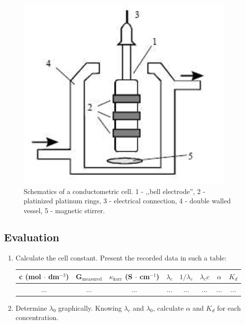 \begin{figure}
\centering
\includegraphics{fig/cond.eps}
\caption{Schematics of a conductometric cell. 1 - ,,bell electrode'', 2 - platinized platinum rings, 3 - electrical connection, 4 - double walled vessel, 5 - magnetic stirrer.}
\label{fig:vez}
\end{figure}

\subsection{Evaluation}

\begin{enumerate}
\item Calculate the cell constant.
Present the recorded data in such a table:

\begin{table}[!h]
\centering
\begin{tabular}{|c|c|c|c|c|c|c|c|}
\hline
c (mol $\cdot$ dm$^{-3}$) & G$_{\text{measured}}$ & $\kappa_{\text{korr}}$ (S $\cdot$ cm$^{-1}$) & $\lambda_c$ & $1/\lambda_c$ & $\lambda_c c$ & $\alpha$ & $K_d$ \\
\hline
... & ... & ... & ... & ... & ... & ... & ... \\
\end{tabular}
\label{table:vez}
\end{table}

\item Determine $\lambda_0$ graphically. Knowing $\lambda_c$ and $\lambda_0$, calculate $\alpha$ and $K_d$ for each concentration.

\end{enumerate}


